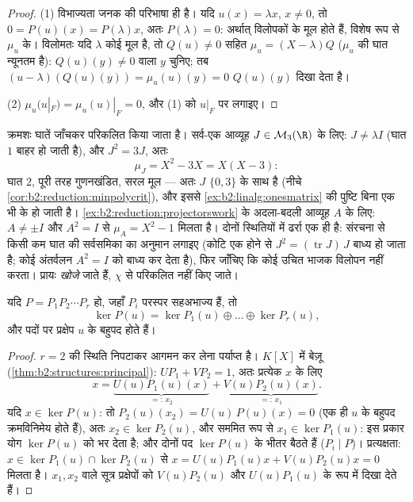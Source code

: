 \begin{proof}
(1) विभाज्यता जनक की परिभाषा ही है। यदि $u(x) =
\lambda x$, $x \neq 0$, तो $0 = P(u)(x) = P(\lambda)x$, अतः $P(\lambda) = 0$:
अर्थात्  विलोपकों के मूल होते हैं, विशेष रूप से $\mu_u$ के।
विलोमतः यदि $\lambda$ कोई मूल है, तो $Q(u) \neq 0$ सहित $\mu_u =
(X - \lambda)Q$ ($\mu_u$ की घात न्यूनतम है):
$Q(u)(y) \neq 0$ वाला $y$ चुनिए; तब $(u - \lambda)(Q(u)(y)) = \mu_u(u)(y)
= 0$  $Q(u)(y)$ दिखा देता है।

(2) $\mu_u(u|_F) = \mu_u(u)|_F = 0$, और (1) को $u|_F$ पर लगाइए।
\end{proof}

\begin{example}[हाथ से न्यूनतम बहुपद]\label{ex:b2:reduction:minpolyhand}
 क्रमशः घातें जाँचकर परिकलित किया जाता है। सर्व-एक आव्यूह
$J \in \mathcal{M}_3(\R)$ के लिए: $J \neq \lambda I$ (घात $1$ बाहर हो जाती है), और $J^2 = 3J$, अतः
\[
\mu_J = X^2 - 3X = X(X - 3) :
\]
घात $2$, पूरी तरह गुणनखंडित, सरल मूल --- अतः $J$  $\{0, 3\}$ के साथ
 है (नीचे \cref{cor:b2:reduction:minpolycrit}), और इससे \cref{ex:b2:linalg:onesmatrix} की पुष्टि बिना एक भी  के
हो जाती है। \cref{ex:b2:reduction:projectorswork} के अदला-बदली आव्यूह $A$ के लिए: $A \neq \pm I$ और $A^2
= I$ से $\mu_A = X^2 - 1$
मिलता है। दोनों स्थितियों में ढर्रा एक ही है: संरचना से किसी कम घात की
सर्वसमिका का अनुमान लगाइए (कोटि एक होने से $J^2 = (\operatorname{tr}J)\,J$ बाध्य हो जाता है; कोई
अंतर्वलन $A^2 = I$ को बाध्य कर देता है), फिर जाँचिए कि कोई उचित भाजक विलोपन
नहीं करता।  प्रायः \emph{खोजे} जाते हैं, $\chi$ से परिकलित
नहीं किए जाते।
\end{example}

\begin{theorem}[केंद्रक अपघटन प्रमेयिका]\label{thm:b2:reduction:kernels}
यदि $P = P_1 P_2 \cdots P_r$ हो, जहाँ $P_i$ परस्पर सहअभाज्य हैं, तो
\[
\ker P(u) = \ker P_1(u) \oplus \dots \oplus \ker P_r(u),
\]
और पदों पर प्रक्षेप $u$ के बहुपद होते हैं।
\end{theorem}

\begin{proof}
$r = 2$ की स्थिति निपटाकर आगमन कर लेना पर्याप्त है। $K[X]$ में बेज़ू (\cref{thm:b2:structures:principal}):
$U P_1 + V P_2 = 1$, अतः प्रत्येक $x$ के लिए
\[
x = \underbrace{U(u)P_1(u)(x)}_{=:\,x_2}
+ \underbrace{V(u)P_2(u)(x)}_{=:\,x_1}.
\]
यदि $x \in \ker P(u)$: तो $P_2(u)(x_2) = U(u)\,P(u)(x) = 0$ (एक ही $u$ के बहुपद क्रमविनिमेय होते हैं), अतः $x_2 \in \ker P_2(u)$,
और सममित रूप से $x_1
\in \ker P_1(u)$: इस प्रकार योग $\ker P(u)$ को भर देता है; और दोनों पद
$\ker P(u)$ के भीतर बैठते हैं ($P_i \mid P$)। प्रत्यक्षता: $x \in \ker P_1(u)
\cap \ker P_2(u)$ से $x = U(u)P_1(u)x + V(u)P_2(u)x = 0$ मिलता है।
$x_1, x_2$ वाले सूत्र प्रक्षेपों को $V(u)P_2(u)$ और $U(u)P_1(u)$ के रूप में दिखा देते हैं।
\end{proof}

